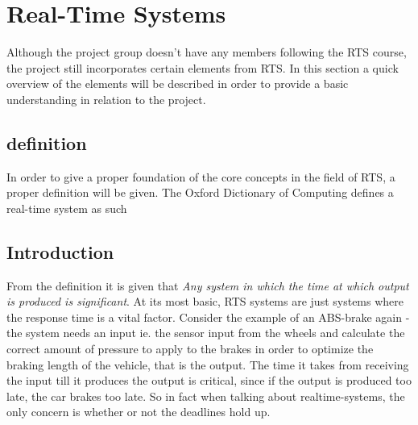 \section{Real-Time Systems}
Although the project group doesn't have any members following the RTS course, the project
still incorporates certain elements from RTS. In this section a quick overview of the elements will be described
in order to provide a basic understanding in relation to the project.
\subsection{definition}
In order to give a proper foundation of the core concepts in the field of RTS, a proper definition will be given.
The Oxford Dictionary of Computing\citep{daintith2008dictionary} defines a real-time system as such
\subsection{Introduction}
From the definition it is given that \textit{Any system in which the time at
which output is produced is significant}. At its most basic, RTS systems are just systems where the response time is a vital factor. Consider the example of an ABS-brake again - the system needs an input
ie. the sensor input from the wheels and calculate the correct amount of pressure to apply to the brakes in order to optimize the braking
length of the vehicle, that is the output. The time it takes from receiving the input till it produces the output is critical,
since if the output is produced too late, the car brakes too late. So in fact when talking about realtime-systems, the only concern is whether
or not the deadlines hold up.
